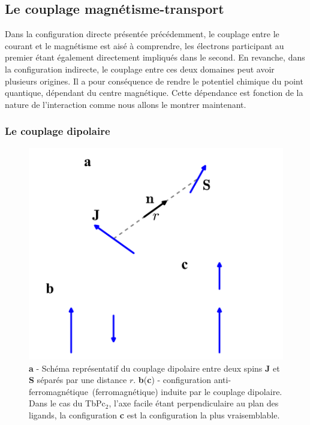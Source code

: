 \subsection{Le couplage magnétisme-transport}
Dans la configuration directe présentée précédemment, le couplage entre le courant et le magnétisme est aisé à comprendre, les électrons participant au premier étant également directement impliqués dans le second. En revanche, dans la configuration indirecte, le couplage entre ces deux domaines peut avoir plusieurs origines. Il a pour conséquence de rendre le potentiel chimique du point quantique, dépendant du centre magnétique. Cette dépendance est fonction de la nature de l'interaction comme nous allons le montrer maintenant.

\subsubsection{Le couplage dipolaire}

\begin{figure}
\parbox{6.5cm}{
\includegraphics[scale=0.45]{Resultats/CDipolaire/CDipolaire.pdf} 
}
\parbox{7cm}{\caption{\textbf{a} - Schéma représentatif du couplage dipolaire entre deux spins \textbf{J} et \textbf{S} séparés par une distance $r$. \textbf{b}(\textbf{c}) - configuration anti-ferromagnétique~(ferromagnétique) induite par le couplage dipolaire. Dans le cas du TbPc$_2$, l'axe facile étant perpendiculaire au plan des ligands, la configuration \textbf{c} est la configuration la plus vraisemblable.}
\label{dipolaire}
}
\end{figure}


